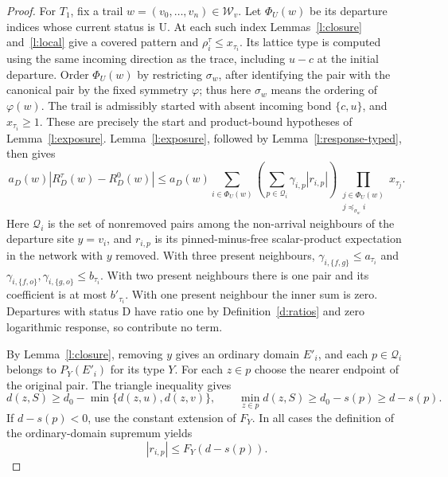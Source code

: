 \begin{proof}
For \(T_1\), fix a trail \(w=(v_0,\ldots,v_n)\in\mathcal W_v\).
Let \(\Phi_U(w)\) be its departure indices whose current status
is \(\mathrm U\).  At each such index Lemmas~\ref{l:closure}
and~\ref{l:local} give a covered pattern and
\(\rho_i^\tau\le x_{\tau_i}\).  Its lattice type is computed
using the same incoming direction as the trace, including
\(u-c\) at the initial departure.  Order \(\Phi_U(w)\) by
restricting \(\sigma_w\), after identifying the pair with the
canonical pair by the fixed symmetry \(\varphi\); thus here
\(\sigma_w\) means the ordering of \(\varphi(w)\).
The trail is admissibly started with absent incoming bond
\(\{c,u\}\), and \(x_{\tau_i}\ge1\).  These are precisely the
start and product-bound hypotheses of Lemma~\ref{l:exposure}.
Lemma~\ref{l:exposure}, followed by Lemma~\ref{l:response-typed},
then gives
\begin{equation}\label{e:rec-exposed}
 a_D(w)|R_D^\tau(w)-R_D^0(w)|
 \le a_D(w)\sum_{i\in\Phi_U(w)}
       \left(\sum_{p\in\mathcal Q_i}\gamma_{i,p}|r_{i,p}|\right)
       \prod_{\substack{j\in\Phi_U(w)\\j\preceq_{\sigma_w}i}}
                           x_{\tau_j}.
\end{equation}
Here \(\mathcal Q_i\) is the set of nonremoved pairs among
the non-arrival neighbours of the departure site \(y=v_i\),
and \(r_{i,p}\) is its pinned-minus-free scalar-product
expectation in the network with \(y\) removed.  With three
present neighbours, \(\gamma_{i,\{f,g\}}\le a_{\tau_i}\) and
\(\gamma_{i,\{f,o\}},\gamma_{i,\{g,o\}}\le b_{\tau_i}\).
With two present neighbours there is one pair and its coefficient
is at most \(b'_{\tau_i}\).  With one present neighbour the
inner sum is zero.  Departures with status \(\mathrm D\) have
ratio one by Definition~\ref{d:ratios} and zero logarithmic
response, so contribute no term.

By Lemma~\ref{l:closure}, removing \(y\) gives an ordinary
domain \(E'_i\), and each \(p\in\mathcal Q_i\) belongs to
\(P_Y(E'_i)\) for its type \(Y\).  For each \(z\in p\)
choose the nearer endpoint of the original pair.  The triangle
inequality gives
\[
 d(z,S)\ge d_0-\min\{d(z,u),d(z,v)\},\qquad
 \min_{z\in p}d(z,S)\ge d_0-s(p)\ge d-s(p).
\]
If \(d-s(p)<0\), use the constant extension of \(F_Y\).
In all cases the definition of the ordinary-domain supremum yields
\begin{equation}\label{e:rec-pair-envelope}
 |r_{i,p}|\le F_Y(d-s(p)).
\end{equation}


\end{proof}
